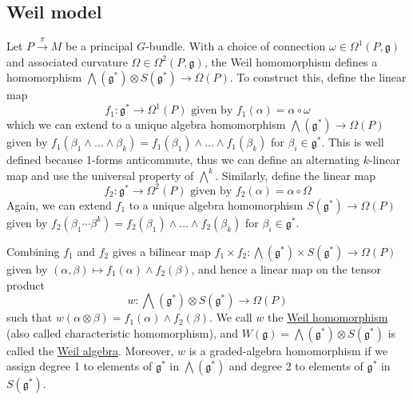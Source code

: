 \subsection{Weil model}
Let $P\xrightarrow{\pi} M$ be a principal  $G$-bundle. With a choice of
connection  $\omega\in\Omega^1(P,\mathfrak{g})$ and associated curvature
$\Omega\in\Omega^2(P,\mathfrak{g})$,
the Weil homomorphism defines a homomorphism $\bigwedge(\mathfrak{g}^*)\otimes
S(\mathfrak{g}^*) \to \Omega(P)$. To construct this, define the linear map 
\[
	f_1 : \mathfrak{g}^* \to \Omega^1(P) \text{ given by }
	f_1(\alpha) = \alpha \circ \omega
\] 
which we can extend to a unique algebra homomorphism 
$\bigwedge(\mathfrak{g}^*)\to\Omega(P)$ given by $f_1(\beta_1\wedge\ldots\wedge \beta_k)
= f_1(\beta_1)\wedge\ldots\wedge f_1(\beta_k)$ for $\beta_i\in\mathfrak{g}^*$.
This is well defined because 1-forms anticommute, thus we can define an
alternating $k$-linear map and use the universal property of  $\bigwedge^k$.
Similarly, define the linear map 
\[
	f_2 : \mathfrak{g}^* \to \Omega^2(P) \text{ given by }
	f_2(\alpha) = \alpha \circ \Omega
\]
Again, we can extend $f_1$ to a unique algebra homomorphism 
$S(\mathfrak{g}^*)\to \Omega(P)$ given by
$f_2(\beta_1\cdots\beta^k)=f_2(\beta_1)\wedge\ldots\wedge f_2(\beta_k)$ for
$\beta_i\in\mathfrak{g}^*$. 

Combining $f_1$ and $f_2$ gives a bilinear map $f_1\times f_2 :
\bigwedge(\mathfrak{g}^*)\times S(\mathfrak{g}^*) \to \Omega(P)$ given by
$(\alpha,\beta)\mapsto f_1(\alpha)\wedge f_2(\beta)$, and hence a linear 
map on the tensor product
\[
w : \bigwedge(\mathfrak{g}^*)\otimes S(\mathfrak{g}^*) \to \Omega(P)
\] 
such that $w(\alpha\otimes \beta) = f_1(\alpha)\wedge f_2(\beta)$.
We call $w$ the \underline{Weil homomorphism} (also called characteristic
homomorphism), and 
$W(\mathfrak{g}) =\bigwedge(\mathfrak{g}^*)\otimes S(\mathfrak{g}^*)$
is called the \underline{Weil algebra}.
Moreover, $w$ is a graded-algebra homomorphism if we assign degree 1 to elements of
$\mathfrak{g}^*$ in $\bigwedge(\mathfrak{g}^*)$ and degree 2 to 
elements of $\mathfrak{g}^*$ in $S(\mathfrak{g}^*)$.

